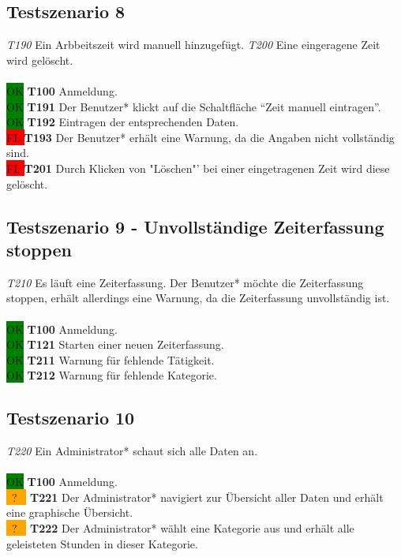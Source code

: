 \subsection{Testszenario 8}%
\emph{T190} Ein Arbbeitszeit wird manuell hinzugefügt. \emph{T200} Eine eingeragene Zeit wird gelöscht.
\\\\
\colorbox{green}{OK} \textbf{T100} Anmeldung. \\
\colorbox{green}{OK} \textbf{T191} Der Benutzer* klickt auf die Schaltfläche "`Zeit manuell eintragen"'. \\
\colorbox{green}{OK} \textbf{T192} Eintragen der entsprechenden Daten. \\
\colorbox{red}{FL } \textbf{T193} Der Benutzer* erhält eine Warnung, da die Angaben nicht vollständig sind. \\
\colorbox{red}{FL } \textbf{T201} Durch Klicken von "Löschen"' bei einer eingetragenen Zeit wird diese gelöscht.

\newpage

\subsection{Testszenario 9 - Unvollständige Zeiterfassung stoppen}
\emph{T210} Es läuft eine Zeiterfassung. Der Benutzer* möchte die Zeiterfassung stoppen, erhält allerdings eine Warnung, da die Zeiterfassung unvollständig ist.
\\\\
\colorbox{green}{OK} \textbf{T100} Anmeldung. \\
\colorbox{green}{OK} \textbf{T121} Starten einer neuen Zeiterfassung. \\
\colorbox{green}{OK} \textbf{T211} Warnung für fehlende Tätigkeit. \\
\colorbox{green}{OK} \textbf{T212} Warnung für fehlende Kategorie.

\subsection{Testszenario 10} %
\emph{T220} Ein Administrator* schaut sich alle Daten an.
\\\\
\colorbox{green}{OK} \textbf{T100} Anmeldung. \\
\colorbox{orange}{  \ ? \  } \textbf{T221} Der Administrator* navigiert zur Übersicht aller Daten und erhält eine graphische Übersicht. \\
\colorbox{orange}{  \ ? \  } \textbf{T222} Der Administrator* wählt eine Kategorie aus und erhält alle geleisteten Stunden in dieser Kategorie.
